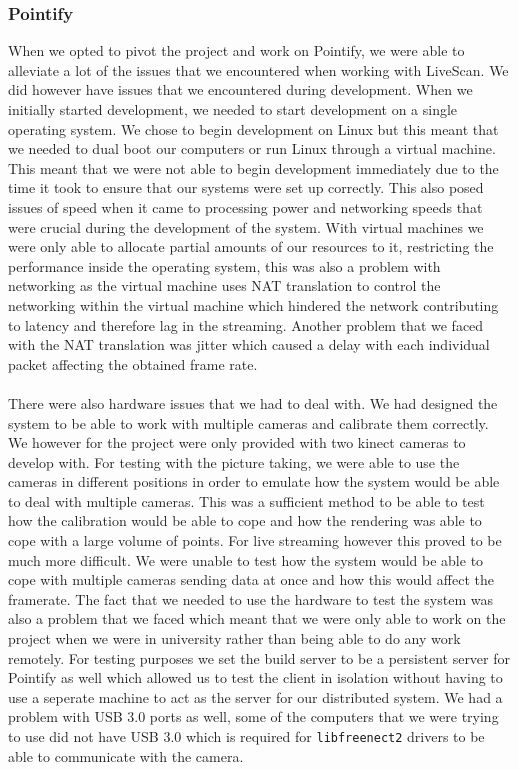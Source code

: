 \documentclass{article}
\begin{document}
\subsubsection{Pointify}
When we opted to pivot the project and work on Pointify, we were able to alleviate a lot of the issues that we encountered when working with LiveScan. We did however have issues that we encountered during development. When we initially started development, we needed to start development on a single operating system. We chose to begin development on Linux but this meant that we needed to dual boot our computers or run Linux through a virtual machine. This meant that we were not able to begin development immediately due to the time it took to ensure that our systems were set up correctly. This also posed issues of speed when it came to processing power and networking speeds that were crucial during the development of the system. With virtual machines we were only able to allocate partial amounts of our resources to it, restricting the performance inside the operating system, this was also a problem with networking as the virtual machine uses NAT translation to control the networking within the virtual machine which hindered the network contributing to latency and therefore lag in the streaming. Another problem that we faced with the NAT translation was jitter which caused a delay with each individual packet affecting the obtained frame rate. 
\\\\
There were also hardware issues that we had to deal with. We had designed the system to be able to work with multiple cameras and calibrate them correctly. We however for the project were only provided with two kinect cameras to develop with. For testing with the picture taking, we were able to use the cameras in different positions in order to emulate how the system would be able to deal with multiple cameras. This was a sufficient method to be able to test how the calibration would be able to cope and how the rendering was able to cope with a large volume of points. For live streaming however this proved to be much more difficult. We were unable to test how the system would be able to cope with multiple cameras sending data at once and how this would affect the framerate. The fact that we needed to use the hardware to test the system was also a problem that we faced which meant that we were only able to work on the project when we were in university rather than being able to do any work remotely. For testing purposes we set the build server to be a persistent server for Pointify as well which allowed us to test the client in isolation without having to use a seperate machine to act as the server for our distributed system. We had a problem with USB 3.0 ports as well, some of the computers that we were trying to use did not have USB 3.0 which is required for \texttt{libfreenect2} drivers to be able to communicate with the camera.
\newpage
\end{document}
